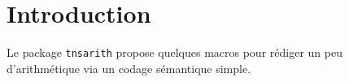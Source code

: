 \documentclass[12pt,a4paper]{article}
\begin{document}
\section{Introduction}

Le package \verb+tnsarith+ propose quelques macros pour rédiger un peu d'arithmétique  via un codage sémantique simple.
\end{document}

